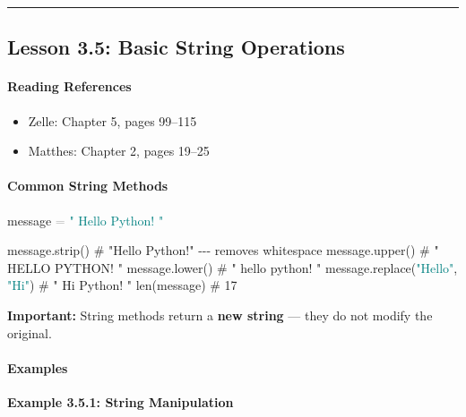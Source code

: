 \documentclass[
  justified,
  openright,
]{tufte-book}
\let\subsubsection\paragraph
\let\paragraph\paragraph
\newcommand{\BuiltInTok}[1]{#1}
\newcommand{\CommentTok}[1]{\textcolor{MidGray}{#1}}
\newcommand{\NormalTok}[1]{#1}
\newcommand{\OperatorTok}[1]{\textcolor{DarkGray}{#1}}
\newcommand{\StringTok}[1]{\textcolor{Teal}{#1}}
\newenvironment{Shaded}{%
  \begin{snugshade}
}{%
  \end{snugshade}
}
\let\subsubsection\paragraph
\let\paragraph\paragraph
\providecommand{\tightlist}{%
  \setlength{\itemsep}{0pt}\setlength{\parskip}{0pt}}
\begin{document}
\begin{center}\rule{0.5\linewidth}{0.5pt}\end{center}

\subsection{Lesson 3.5: Basic String
Operations}\label{lesson-3.5-basic-string-operations}

\subsubsection{Reading References}\label{reading-references-16}

\begin{itemize}
\tightlist
\item
  Zelle: Chapter 5, pages 99--115
\item
  Matthes: Chapter 2, pages 19--25
\end{itemize}

\subsubsection{Common String Methods}\label{common-string-methods}

\begin{Shaded}
\begin{Highlighting}[]
\NormalTok{message }\OperatorTok{=} \StringTok{"  Hello Python!  "}

\NormalTok{message.strip()          }\CommentTok{\# "Hello Python!"   {-}{-}{-} removes whitespace}
\NormalTok{message.upper()          }\CommentTok{\# "  HELLO PYTHON!  "}
\NormalTok{message.lower()          }\CommentTok{\# "  hello python!  "}
\NormalTok{message.replace(}\StringTok{"Hello"}\NormalTok{, }\StringTok{"Hi"}\NormalTok{)  }\CommentTok{\# "  Hi Python!  "}
\BuiltInTok{len}\NormalTok{(message)             }\CommentTok{\# 17}
\end{Highlighting}
\end{Shaded}

\textbf{Important:} String methods return a \textbf{new string} --- they
do not modify the original.

\subsubsection{Examples}\label{examples-9}

\textbf{Example 3.5.1: String Manipulation}
\end{document}
